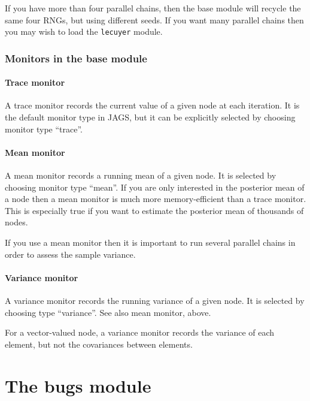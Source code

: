 \documentclass[11pt, a4paper, titlepage]{report}
\newcommand{\JAGS}{\textsf{JAGS}}
\begin{document}
If you have more than four parallel chains, then the base module will
recycle the same four RNGs, but using different seeds. If you want
many parallel chains then you may wish to load the \verb+lecuyer+
module.


\subsection{Monitors in the base module}
\label{section:base:monitors}

\subsubsection{Trace monitor}

A trace monitor records the current value of a given node at each
iteration. It is the default monitor type in \JAGS, but it can be
explicitly selected by choosing monitor type ``trace''.

\subsubsection{Mean monitor}

A mean monitor records a running mean of a given node. It is selected
by choosing monitor type ``mean''. If you are only interested in the
posterior mean of a node then a mean monitor is much more
memory-efficient than a trace monitor. This is especially true if you
want to estimate the posterior mean of thousands of nodes.

If you use a mean monitor then it is important to run several parallel
chains in order to assess the sample variance.

\subsubsection{Variance monitor}

A variance monitor records the running variance of a given node. It is
selected by choosing type ``variance''. See also mean monitor, above.

For a vector-valued node, a variance monitor records the variance of
each element, but not the covariances between elements.

\chapter{The bugs module}
\label{chapter:bugsmod}
\end{document}
